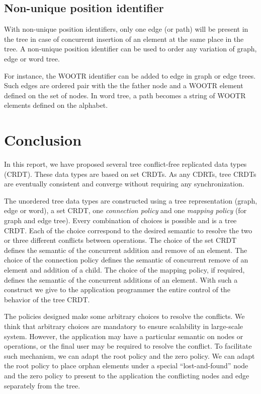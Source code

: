 \documentclass[a4paper]{article}
\begin{document}
\subsection{Non-unique position identifier}


With non-unique position identifiers, only one edge (or path) will be
present in the tree in case of concurrent insertion of an element at
the same place in the tree. A non-unique position identifier can be
used to order any variation of graph, edge or word tree.

For instance, the WOOTR identifier can be added to edge in graph or
edge trees. Such edges are ordered pair  with the  the
father node and  a WOOTR element defined on the set of nodes. In
word tree, a path becomes  a string of WOOTR
elements defined on the alphabet.


\section{Conclusion}
\label{sec:conclusion}

In this report, we have proposed several tree conflict-free replicated
data types (CRDT). These data types are based on set CRDTs. As any
CDRTs, tree CRDTs are eventually consistent and converge without
requiring any synchronization.

The unordered tree data types are constructed using a tree
representation (graph, edge or word), a set CRDT, one {\em connection
  policy} and one {\em mapping policy} (for graph and edge
tree). Every combination of choices is possible and is a tree
CRDT. Each of the choice correspond to the desired semantic to resolve
the two or three different conflicts between operations. The choice of
the set CRDT defines the semantic of the concurrent addition and
remove of an element. The choice of the connection policy defines the
semantic of concurrent remove of an element and addition of a
child. The choice of the mapping policy, if required, defines the
semantic of the concurrent additions of an element. With such a
construct we give to the application programmer the entire control of
the behavior of the tree CRDT.

The policies designed make some arbitrary choices to resolve the
conflicts. We think that arbitrary choices are mandatory to ensure
scalability in large-scale system. However, the application may have a
particular semantic on nodes or operations, or the final user may be
required to resolve the conflict. To facilitate such mechanism, we can
adapt the root policy and the zero policy. We can adapt the root
policy to place orphan elements under a special ``lost-and-found''
node and the zero policy to present to the application the conflicting
nodes and edge separately from the tree. 
\end{document}
